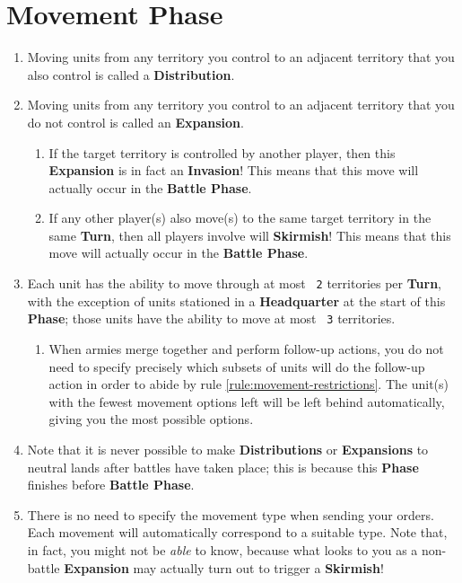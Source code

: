\documentclass[10pt,openright,a4paper,openany]{article}
\newcommand{\num}[1]{\texttt{\color{purple} {#1}}}
\newcommand{\term}[1]{\textbf{\color{purple} #1}}
\newcommand{\headquarter}{\term{Headquarter}}
\begin{document}
\section{Movement Phase}\label{sec:movement}
\begin{enumerate}
	\item Moving units from any territory you control to an adjacent territory that you also control is called a \term{Distribution}.
	\item Moving units from any territory you control to an adjacent territory that you do not control is called an \term{Expansion}.
	\begin{enumerate}
		\item If the target territory is controlled by another player, then this \term{Expansion} is in fact an \term{Invasion}! This means that this move will actually occur in the \term{Battle Phase}.
		\item If any other player(s) also move(s) to the same target territory in the same \term{Turn}, then all players involve will \term{Skirmish}! This means that this move will actually occur in the \term{Battle Phase}.
	\end{enumerate}
	\item \label{rule:movement-restrictions}Each unit has the ability to move through at most \num{2} territories per \term{Turn}, with the exception of units stationed in a \headquarter{} at the start of this \term{Phase}; those units have the ability to move at most \num{3} territories.
	\begin{enumerate}
		\item When armies merge together and perform follow-up actions, you do not need to specify precisely which subsets of units will do the follow-up action in order to abide by rule \ref{rule:movement-restrictions}. The unit(s) with the fewest movement options left will be left behind automatically, giving you the most possible options.
	\end{enumerate}
	\item Note that it is never possible to make \term{Distributions} or \term{Expansions} to neutral lands after battles have taken place; this is because this \term{Phase} finishes before \term{Battle Phase}.
	\item There is no need to specify the movement type when sending your orders. Each movement will automatically correspond to a suitable type. Note that, in fact, you might not be \emph{able} to know, because what looks to you as a non-battle \term{Expansion} may actually turn out to trigger a \term{Skirmish}!

\end{enumerate}
\end{document}
